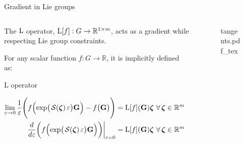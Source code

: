 \begin{frame}{Gradient in Lie groups}
\begin{columns}[c]
        \begin{column}{0.6\linewidth}
            The $\operatorname{L}$ operator, $\operatorname{L}[f]:G\to\mathbb{R}^{1\times m}$, acts as a gradient while respecting Lie group constraints.
            \newline

            For any scalar function $f: G \to \mathbb{R}$, it is implicitly defined as:
            \begin{exampleblock}{L operator}
                {\centering $\displaystyle 
                \begin{aligned} \lim_{\varepsilon \rightarrow 0} \frac{1}{\varepsilon} \Biggl( f\Bigl(\exp\bigl(\SL[\boldsymbol{\zeta}]\varepsilon\bigr)\mathbf{G}\Bigr) - f\bigl(\mathbf{G}\bigr) \Biggr) &= \Lop[f](\mathbf{G}) \boldsymbol{\zeta} \ \forall\, \boldsymbol{\zeta} \in \mathbb{R}^m
                \\\left.\frac{d}{d\varepsilon}\biggl(f\Bigl(\exp\bigl(\SL[\boldsymbol{\zeta}]\varepsilon\bigr)\mathbf{G}\Bigr)\biggr)\right|_{\varepsilon=0} &= \Lop[f](\mathbf{G})\boldsymbol{\zeta}\ \forall\, \boldsymbol{\zeta} \in \mathbb{R}^m
                \end{aligned}$ 
                \par}%
            \end{exampleblock}
        \end{column}
        \begin{column}{0.4\linewidth}
           \begin{figure}[ht!]
                \centering
                \def\svgwidth{\linewidth}
                {\footnotesize{tangents.pdf_tex}}
            \end{figure}
        \end{column}
    \end{columns}
    
\end{frame}

